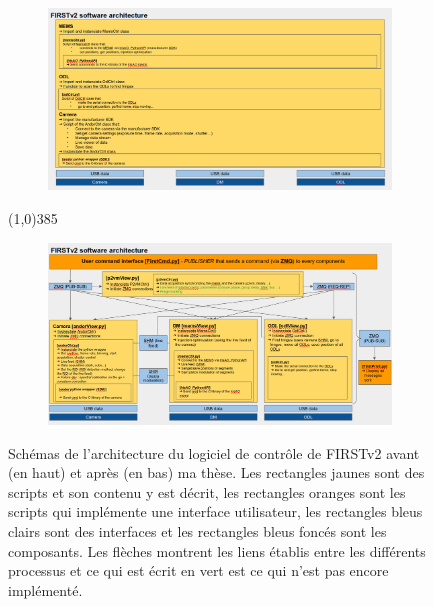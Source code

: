 \begin{figure}[ht!]
    \centering
    \begin{subfigure}{0.9\textwidth}
        \centering
        \includegraphics[width=\textwidth]{Figure_Chap2/SoftwareArchitecture_FIRSTv2_v1.png}
    \end{subfigure}
    \line(1,0){385}\\
    \begin{subfigure}{0.9\textwidth}
        \centering
        \includegraphics[width=\textwidth]{Figure_Chap2/SoftwareArchitecture_FIRSTv2_v2.png}
    \end{subfigure}
    \caption[Schémas de l'architecture du logiciel de contrôle de FIRSTv2 avant et après ma thèse.]{Schémas de l'architecture du logiciel de contrôle de FIRSTv2 avant (en haut) et après (en bas) ma thèse. Les rectangles jaunes sont des scripts et son contenu y est décrit, les rectangles oranges sont les scripts qui implémente une interface utilisateur, les rectangles bleus clairs sont des interfaces et les rectangles bleus foncés sont les composants. Les flèches montrent les liens établis entre les différents processus et ce qui est écrit en vert est ce qui n'est pas encore implémenté.}
    \label{fig:SoftwareArchitecture}
\end{figure}

